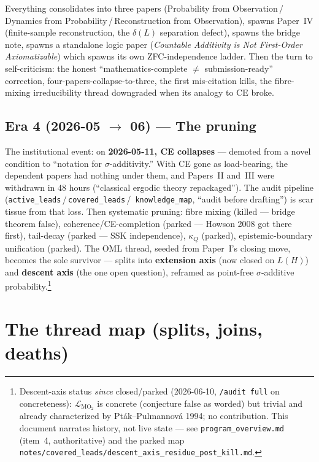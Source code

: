 \documentclass[11pt]{article}
\begin{document}
Everything consolidates into three papers (Probability from Observation\,/\,
Dynamics from Probability\,/\,Reconstruction from Observation), spawns Paper~IV
(finite-sample reconstruction, the $\delta(L)$ separation defect), spawns the
bridge note, spawns a standalone logic paper (\emph{Countable Additivity is Not
First-Order Axiomatizable}) which spawns its own ZFC-independence ladder. Then
the turn to self-criticism: the honest ``mathematics-complete $\neq$
submission-ready'' correction, four-papers-collapse-to-three, the first
mis-citation kills, the fibre-mixing irreducibility thread downgraded when its
analogy to CE broke.

\subsection{Era 4 (2026-05 $\to$ 06) --- The pruning}

The institutional event: on \textbf{2026-05-11, CE collapses} --- demoted from a
novel condition to ``notation for $\sigma$-additivity.'' With CE gone as
load-bearing, the dependent papers had nothing under them, and Papers~II and~III
were withdrawn in 48 hours (``classical ergodic theory repackaged''). The audit
pipeline (\texttt{active\_leads}\,/\,\texttt{covered\_leads}\,/\,
\texttt{knowledge\_map}, ``audit before drafting'') is scar tissue from that
loss. Then systematic pruning: fibre mixing (killed --- bridge theorem false),
coherence/CE-completion (parked --- Howson 2008 got there first), tail-decay
(parked --- SSK independence), $\kappa_Q$ (parked), epistemic-boundary
unification (parked). The OML thread, seeded from Paper~I's closing move, becomes
the sole survivor --- splits into \textbf{extension axis} (now closed on $L(H)$)
and \textbf{descent axis} (the one open question), reframed as point-free
$\sigma$-additive probability.\footnote{Descent-axis status \emph{since}
closed/parked (2026-06-10, \texttt{/audit full} on concreteness): $\mathcal
L_{\mathrm{MO}_2}$ is concrete (conjecture false as worded) but trivial and
already characterized by Pt\'ak--Pulmannov\'a 1994; no contribution. This
document narrates history, not live state --- see
\texttt{program\_overview.md} (item~4, authoritative) and the parked map
\texttt{notes/covered\_leads/descent\_axis\_residue\_post\_kill.md}.}

\section{The thread map (splits, joins, deaths)}
\end{document}
